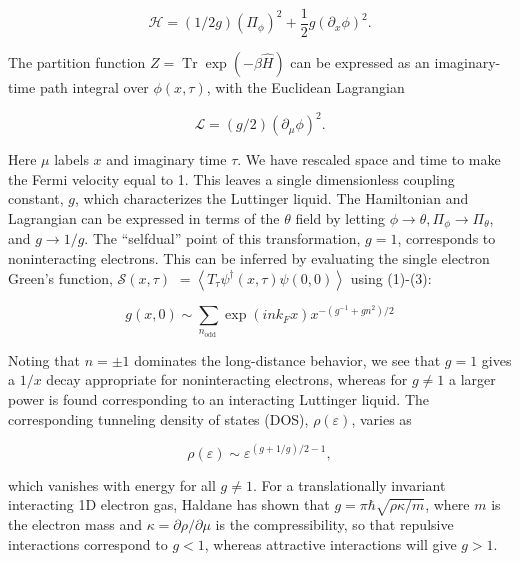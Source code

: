 \documentclass[11pt]{article}
\begin{document}
\begin{equation}
\mathcal{H}=(1 / 2 g)\left(\Pi_{\phi}\right)^{2}+\frac{1}{2} g\left(\partial_{x} \phi\right)^{2} . 
\end{equation}

The partition function $Z=\operatorname{Tr} \exp (-\beta \hat{H})$ can be expressed as an imaginary-time path integral over $\phi(x, \tau)$, with the Euclidean Lagrangian

\begin{equation}
\mathcal{L}=(g / 2)\left(\partial_{\mu} \phi\right)^{2} . 
\end{equation}

Here $\mu$ labels $x$ and imaginary time $\tau$. We have rescaled space and time to make the Fermi velocity equal to 1. This leaves a single dimensionless coupling constant, $g$, which characterizes the Luttinger liquid. The Hamiltonian and Lagrangian can be expressed in terms of the $\theta$ field by letting $\phi \rightarrow \theta, \Pi_{\phi} \rightarrow \Pi_{\theta}$, and $g \rightarrow 1 / g$. The ``selfdual'' point of this transformation, $g=1$, corresponds to noninteracting electrons. This can be inferred by evaluating the single electron Green's function, $\mathcal{S}(x, \tau)$ $=\left\langle T_{\tau} \psi^{\dagger}(x, \tau) \psi(0,0)\right\rangle$ using (1)-(3):

\begin{equation}
g(x, 0) \sim \sum_{n_{\text {odd }}} \exp \left(i n k_{F} x\right) x^{-\left(g^{-1}+g n^{2}\right) / 2} 
\end{equation}

Noting that $n= \pm 1$ dominates the long-distance behavior, we see that $g=1$ gives a $1 / x$ decay appropriate for noninteracting electrons, whereas for $g \neq 1$ a larger power is found corresponding to an interacting Luttinger liquid. The corresponding tunneling density of states (DOS), $\rho(\varepsilon)$, varies as

\begin{equation*}
    \rho(\varepsilon) \sim \varepsilon^{(g+1 / g) / 2-1},
\end{equation*}

which vanishes with energy for all $g \neq 1$. For a translationally invariant interacting 1D electron gas, Haldane \cite{ref11} has shown that $g=\pi \hbar \sqrt{\rho \kappa / m}$, where $m$ is the electron mass and $\kappa=\partial \rho / \partial \mu$ is the compressibility, so that repulsive interactions correspond to $g<1$, whereas attractive interactions will give $g>1$.
\end{document}
